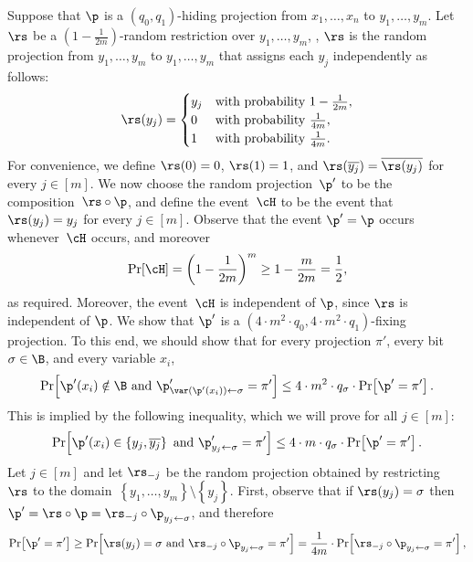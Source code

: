 \documentclass{toc}
\begin{document}
Suppose that $\p$ is a $(q_{0},q_{1})$-hiding projection from $x_{1},\ldots,x_{n}$
to $y_{1},\ldots,y_{m}$. Let $\rs$ be a $\left(1-\frac{1}{2m}\right)$-random
restriction over $y_{1},\ldots,y_{m}$, \ie, $\rs$ is the random
projection from $y_{1},\ldots,y_{m}$ to $y_{1},\ldots,y_{m}$ that
assigns each $y_{j}$ independently as follows: 
\[
\rs(y_{j})=\begin{cases}
y_{j} & \text{with probability \ensuremath{1-\frac{1}{2m}}},\\
0 & \text{with probability \ensuremath{\frac{1}{4m}}},\\
1 & \text{with probability \ensuremath{\frac{1}{4m}}}.
\end{cases}
\]
For convenience, we define $\rs(0)=0$, $\rs(1)=1$, and $\rs(\overline{y_{j}})=\overline{\rs(y_{j})}$
for every $j\in\left[m\right]$. We now choose the random projection~$\p'$
to be the composition~$\rs\circ\p$, and define the event~$\cH$
to be the event that $\rs(y_{j})=y_{j}$ for every $j\in\left[m\right]$.
Observe that the event $\p'=\p$ occurs whenever~$\cH$ occurs, and
moreover 
\[
\Pr\!\left[\cH\right]=\left(1-\frac{1}{2m}\right)^{m}\ge1-\frac{m}{2m}=\frac{1}{2},
\]
as required. Moreover, the event~$\cH$ is independent of $\p$,
since $\rs$ is independent of $\p$. We show that $\p'$ is a $(4\cdot m^{2}\cdot q_{0},4\cdot m^{2}\cdot q_{1})$-fixing
projection. To this end, we should show that for every projection
$\pi'$, every bit $\sigma\in\B$, and every variable $x_{i}$, 
\begin{equation}
\Pr\!\left[\p'(x_{i})\notin\B\text{ and }\p_{\var(\p'(x_{i}))\gets\sigma}'=\pi'\right]\leq4\cdot m^{2}\cdot q_{\sigma}\cdot\Pr\!\left[\p'=\pi'\right].\label{eq:shrinkage-hiding-goal-after-summation}
\end{equation}
This is implied by the following inequality, which we will prove for
all $j\in\left[m\right]$: 
\begin{equation}
\Pr\!\left[\p'(x_{i})\in\left\{ y_{j},\overline{y_{j}}\right\} \text{ and }\p_{y_{j}\gets\sigma}'=\pi'\right]\leq4\cdot m\cdot q_{\sigma}\cdot\Pr\!\left[\p'=\pi'\right].\label{eq:shrinkage-hiding-goal}
\end{equation}
Let $j\in\left[m\right]$ and let $\rs_{-j}$ be the random projection
obtained by restricting~$\rs$ to the domain~$\left\{ y_{1},\ldots,y_{m}\right\} \setminus\left\{ y_{j}\right\} $.
First, observe that if $\rs(y_{j})=\sigma$ then $\p'=\rs\circ\p=\rs_{-j}\circ\p_{y_{j}\gets\sigma}$,
and therefore 
\[
\Pr\!\left[\p'=\pi'\right]\geq\Pr\!\left[\rs(y_{j})=\sigma\text{ and }\rs_{-j}\circ\p_{y_{j}\gets\sigma}=\pi'\right]=\frac{1}{4m}\cdot\Pr\!\left[\rs_{-j}\circ\p_{y_{j}\gets\sigma}=\pi'\right],
\]
\end{document}
